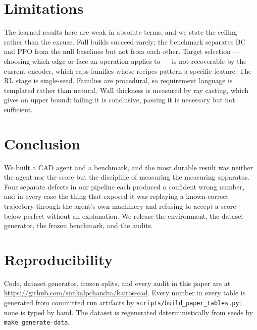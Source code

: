 \documentclass{article}
\begin{document}
\section{Limitations}\label{sec:limitations}

The learned results here are weak in absolute terms, and we state the ceiling
rather than the excuse. Full builds succeed rarely; the benchmark separates BC
and PPO from the null baselines but not from each other. Target selection ---
choosing which edge or face an operation applies to --- is not recoverable by the
current encoder, which caps families whose recipes pattern a specific feature.
The RL stage is single-seed. Families are procedural, so requirement language is
templated rather than natural. Wall thickness is measured by ray casting, which
gives an upper bound: failing it is conclusive, passing it is necessary but not
sufficient.

\section{Conclusion}

We built a CAD agent and a benchmark, and the most durable result was neither the
agent nor the score but the discipline of measuring the measuring apparatus. Four
separate defects in our pipeline each produced a confident wrong number, and in
every case the thing that exposed it was replaying a known-correct trajectory
through the agent's own machinery and refusing to accept a score below perfect
without an explanation. We release the environment, the dataset generator, the
frozen benchmark, and the audits.

\section*{Reproducibility}

Code, dataset generator, frozen splits, and every audit in this paper are at
\url{https://github.com/sunkalpchandra/kairos-cad}. Every number in every table
is generated from committed run artifacts by
\texttt{scripts/build\_paper\_tables.py}; none is typed by hand. The dataset is
regenerated deterministically from seeds by \texttt{make generate-data}.



\end{document}

